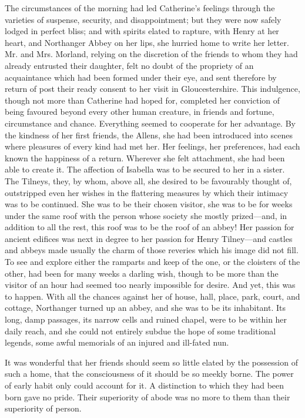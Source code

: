 The circumstances of the morning had led Catherine's feelings through the varieties of suspense, security, and disappointment; but they were now safely lodged in perfect bliss; and with spirits elated to rapture, with Henry at her heart, and Northanger Abbey on her lips, she hurried home to write her letter. Mr. and Mrs. Morland, relying on the discretion of the friends to whom they had already entrusted their daughter, felt no doubt of the propriety of an acquaintance which had been formed under their eye, and sent therefore by return of post their ready consent to her visit in Gloucestershire. This indulgence, though not more than Catherine had hoped for, completed her conviction of being favoured beyond every other human creature, in friends and fortune, circumstance and chance. Everything seemed to cooperate for her advantage. By the kindness of her first friends, the Allens, she had been introduced into scenes where pleasures of every kind had met her. Her feelings, her preferences, had each known the happiness of a return. Wherever she felt attachment, she had been able to create it. The affection of Isabella was to be secured to her in a sister. The Tilneys, they, by whom, above all, she desired to be favourably thought of, outstripped even her wishes in the flattering measures by which their intimacy was to be continued. She was to be their chosen visitor, she was to be for weeks under the same roof with the person whose society she mostly prized---and, in addition to all the rest, this roof was to be the roof of an abbey! Her passion for ancient edifices was next in degree to her passion for Henry Tilney---and castles and abbeys made usually the charm of those reveries which his image did not fill. To see and explore either the ramparts and keep of the one, or the cloisters of the other, had been for many weeks a darling wish, though to be more than the visitor of an hour had seemed too nearly impossible for desire. And yet, this was to happen. With all the chances against her of house, hall, place, park, court, and cottage, Northanger turned up an abbey, and she was to be its inhabitant. Its long, damp passages, its narrow cells and ruined chapel, were to be within her daily reach, and she could not entirely subdue the hope of some traditional legends, some awful memorials of an injured and ill-fated nun.

It was wonderful that her friends should seem so little elated by the possession of such a home, that the consciousness of it should be so meekly borne. The power of early habit only could account for it. A distinction to which they had been born gave no pride. Their superiority of abode was no more to them than their superiority of person.

